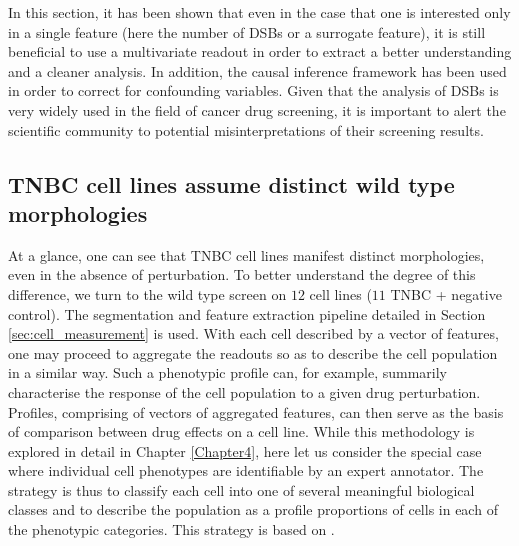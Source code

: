 
In this section, it has been shown that even in the case that one is interested only in a single feature (here the number of DSBs or a surrogate feature), it is still beneficial to use a multivariate readout in order to extract a better understanding and a cleaner analysis. In addition, the causal inference framework has been used in order to correct for confounding variables. Given that the analysis of DSBs is very widely used in the field of cancer drug screening, it is important to alert the scientific community to potential misinterpretations of their screening results.

%

\subsection{TNBC cell lines assume distinct wild type morphologies}
\label{subsec:tnbc_classification}

At a glance, one can see that TNBC cell lines manifest distinct morphologies, even in the absence of perturbation. To better understand the degree of this difference, we turn to the wild type screen on $12$ cell lines ($11$ TNBC + negative control). The segmentation and feature extraction pipeline detailed in Section \ref{sec:cell_measurement} is used. With each cell described by a vector of features, one may proceed to aggregate the readouts so as to describe the cell population in a similar way. Such a phenotypic profile can, for example, summarily characterise the response of the cell population to a given drug perturbation. Profiles, comprising of vectors of aggregated features, can then serve as the basis of comparison between drug effects on a cell line. While this methodology is explored in detail in Chapter \ref{Chapter4}, here let us consider the special case where individual cell phenotypes are identifiable by an expert annotator. The strategy is thus to classify each cell into one of several meaningful biological classes and to describe the population as a profile proportions of cells in each of the phenotypic categories. This strategy is based on \cite{neumann2010phenotypic}.

